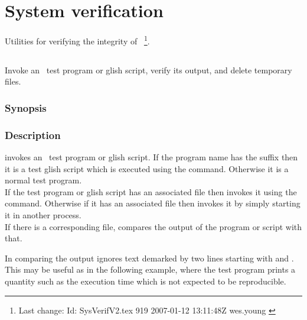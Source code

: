 \chapter{System verification}
\label{System verification}

Utilities for verifying the integrity of \aipspp\ \footnote{Last change:
$ $Id: SysVerifV2.tex 919 2007-01-12 13:11:48Z wes.young $ $}.


\section{}
\label{assay}
 
Invoke an \aipspp\ test program or glish script, verify its output,
and delete temporary files.

\subsection*{Synopsis}
 
\begin{synopsis}
\end{synopsis}
 
\subsection*{Description}
 
 invokes an \aipspp\ test program or glish script.
If the program name has the suffix  then it is a test glish
script which is executed using the  command.
Otherwise it is a normal test program.
\\If the test program or glish script has an
associated  file then  invokes it using
the  command.  Otherwise if it has an associated
 file then  invokes it by simply starting
it in another process.
\\
If there is a corresponding  file,  compares
the output of the program or script with that.

In comparing the output  ignores text demarked by two lines
starting with \code{>>>} and \code{<<<}.  This may be useful as in the
following example, where the test program prints a quantity such as the
execution time which is not expected to be reproducible.

